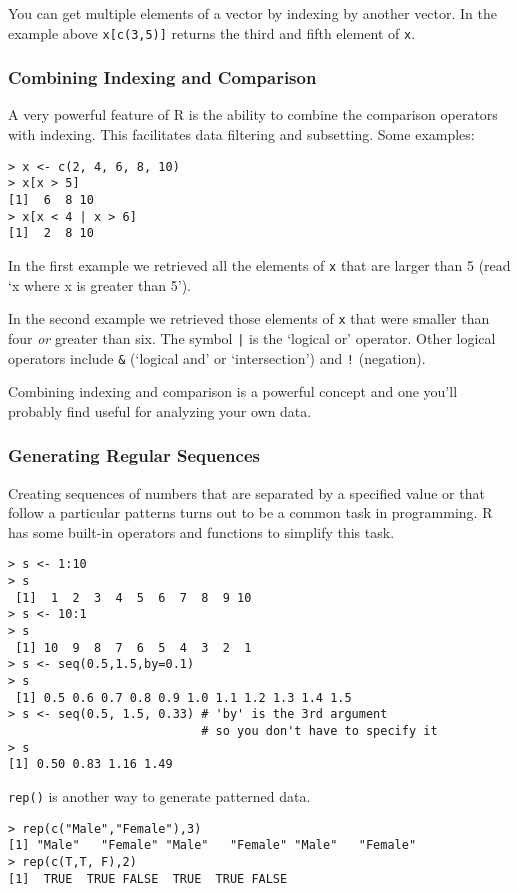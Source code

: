 \documentclass{article}
\begin{document}
You can get multiple elements of a vector by indexing by another vector.
In the example above \lstinline!x[c(3,5)]! returns the third and fifth
element of \lstinline!x!.

\subsubsection{Combining Indexing and Comparison}

A very powerful feature of R is the ability to combine the comparison
operators with indexing. This facilitates data filtering and subsetting.
Some examples:

\begin{lstlisting}
> x <- c(2, 4, 6, 8, 10)
> x[x > 5]
[1]  6  8 10
> x[x < 4 | x > 6]
[1]  2  8 10
\end{lstlisting}
In the first example we retrieved all the elements of \lstinline!x! that
are larger than 5 (read `x where x is greater than 5').

In the second example we retrieved those elements of \lstinline!x! that
were smaller than four \emph{or} greater than six. The symbol
\lstinline!|! is the `logical or' operator. Other logical operators
include \lstinline!&! (`logical and' or `intersection') and
\lstinline"!" (negation).

Combining indexing and comparison is a powerful concept and one you'll
probably find useful for analyzing your own data.

\subsubsection{Generating Regular Sequences}

Creating sequences of numbers that are separated by a specified value or
that follow a particular patterns turns out to be a common task in
programming. R has some built-in operators and functions to simplify
this task.

\begin{lstlisting}
> s <- 1:10
> s
 [1]  1  2  3  4  5  6  7  8  9 10
> s <- 10:1
> s
 [1] 10  9  8  7  6  5  4  3  2  1
> s <- seq(0.5,1.5,by=0.1)
> s
 [1] 0.5 0.6 0.7 0.8 0.9 1.0 1.1 1.2 1.3 1.4 1.5
> s <- seq(0.5, 1.5, 0.33) # 'by' is the 3rd argument
                           # so you don't have to specify it
> s
[1] 0.50 0.83 1.16 1.49 
\end{lstlisting}
\lstinline!rep()! is another way to generate patterned data.

\begin{lstlisting}
> rep(c("Male","Female"),3)
[1] "Male"   "Female" "Male"   "Female" "Male"   "Female"
> rep(c(T,T, F),2)
[1]  TRUE  TRUE FALSE  TRUE  TRUE FALSE
\end{lstlisting}
\end{document}
